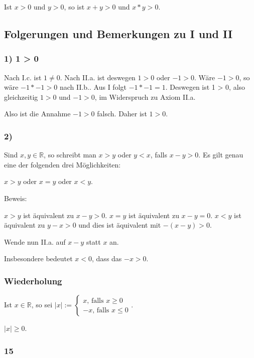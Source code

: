 \documentclass[a4paper,10pt]{article}
\begin{document}
Ist $x > 0$ und $y > 0$, so ist $x + y > 0$ und $x * y > 0$.

\subsection{Folgerungen und Bemerkungen zu I und II}

\subsubsection{1) 1 > 0}

Nach I.c. ist $1 \ne 0$. Nach II.a. ist deswegen $1 > 0$ oder $-1 > 0$. Wäre $-1 > 0$, so wäre $-1 * -1 > 0$ nach II.b.. Aus I folgt
$-1 * -1 = 1$. Deswegen ist 1 > 0, also gleichzeitig $1 > 0$ und $-1 > 0$, im Widerspruch zu Axiom II.a.

Also ist die Annahme $-1 > 0$ falsch. Daher ist $1 > 0$.

\subsubsection{2)}

Sind $x, y \in \mathbb{R}$, so schreibt man $x > y$ oder $y < x$, falls $x - y > 0$. Es gilt genau eine der folgenden drei Möglichkeiten:

$x > y$ oder $x = y$ oder $x < y$.

Beweis:

$x > y$ ist äquivalent zu $x - y > 0$.
$x = y$ ist äquivalent zu $x - y = 0$.
$x < y$ ist äquivalent zu $y - x > 0$ und dies ist äquivalent mit $-(x - y) > 0$.

Wende nun II.a. auf $x - y$ statt $x$ an.

Insbesondere bedeutet $x < 0$, dass das $-x > 0$.

\subsubsection{Wiederholung}

Ist $x \in \mathbb{R}$, so sei $|x| := \begin{cases} x\text{, falls } x \ge 0\\ -x\text{, falls } x \le 0\end{cases}$.

$|x| \ge 0$.

\subsubsection{15}
\end{document}
